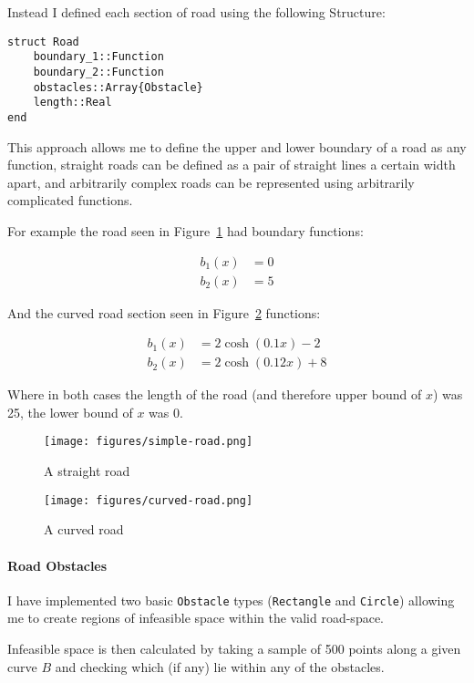 Instead I defined each section of road using the following Structure:

\begin{verbatim}
struct Road
    boundary_1::Function
    boundary_2::Function
    obstacles::Array{Obstacle}
    length::Real
end
\end{verbatim}

This approach allows me to define the upper and lower boundary of a road as any function, straight roads can be defined as a pair of straight lines a certain width apart, and arbitrarily complex roads can be represented using arbitrarily complicated functions.

For example the road seen in Figure~\ref{fig:simple-road} had boundary functions:

\begin{align*}
  b_{1}(x) &= 0 \\
  b_{2}(x) &= 5
\end{align*}

And the curved road section seen in Figure~\ref{fig:curved-road} functions:

\begin{align*}
  b_{1}(x) &= 2\cosh (0.1x)-2 \\
  b_{2}(x) &= 2\cosh(0.12x)+8
\end{align*}

Where in both cases the length of the road (and therefore upper bound of $x$) was 25, the lower bound of $x$ was 0.

\begin{figure}[ht]
  \centering
  \texttt{[image: figures/simple-road.png]}
  \caption{\label{fig:simple-road} A straight road}
\end{figure}

\begin{figure}[ht]
  \centering
  \texttt{[image: figures/curved-road.png]}
  \caption{\label{fig:curved-road} A curved road}
\end{figure}

\paragraph{Road Obstacles}

I have implemented two basic \texttt{Obstacle} types (\texttt{Rectangle} and \texttt{Circle}) allowing me to create regions of infeasible space within the valid road-space.

Infeasible space is then calculated by taking a sample of 500 points along a given curve $B$ and checking which (if any) lie within any of the obstacles.

